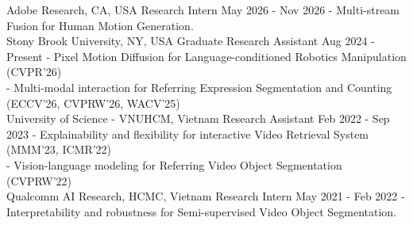 
\begin{experiences}

\researchexperience
    {Adobe Research, CA, USA}
    {Research Intern} {May 2026 - Nov 2026}
    {
        - Multi-stream Fusion for Human Motion Generation. \\ 
    }
\emptySeparator
\researchexperience
    {Stony Brook University, NY, USA}
    {Graduate Research Assistant} {Aug 2024 - Present}
    {
        - Pixel Motion Diffusion for Language-conditioned Robotics Manipulation (CVPR'26) \\ 
        - Multi-modal interaction for Referring Expression Segmentation and Counting (ECCV'26, CVPRW'26, WACV'25) \\
    }
  \emptySeparator
\researchexperience
    {University of Science - VNUHCM, Vietnam}
    {Research Assistant} {Feb 2022 - Sep 2023}
    {
        - Explainability  and flexibility for interactive Video Retrieval System (MMM'23, ICMR'22) \\
        - Vision-language modeling for Referring Video Object Segmentation (CVPRW'22)  \\
    }
  \emptySeparator
\researchexperience
    {Qualcomm AI Research, HCMC, Vietnam}
    {Research Intern} {May 2021 - Feb 2022}
    {
        - Interpretability and robustness for Semi-supervised Video Object Segmentation.
    }
\end{experiences}
